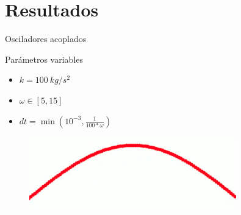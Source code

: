 \section{Resultados}\label{sec:resultados}

\begin{frame}{Osciladores acoplados}
    \begin{minipage}{0.45\textwidth}
        \begin{block}{Parámetros variables}
            \begin{itemize}
                \item $k = 100\ kg/s^2$
                \item $\omega \in [5, 15]$
                \item $dt = \min(10^{-3}, \frac{1}{100*\omega})$
            \end{itemize}
        \end{block}
    \end{minipage}
    \hfill
    \begin{minipage}{0.45\textwidth}
        \begin{figure}[H]
            \centering
            \includegraphics[width=0.8\textwidth]{pic/05-results/system_animation}
            \label{fig:system-animation}
        \end{figure}
        \tiny{\href{}{}}
    \end{minipage}
\end{frame}

